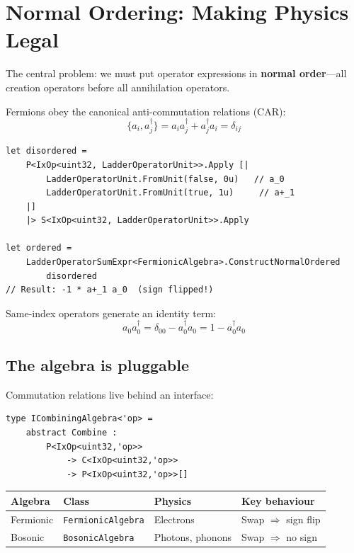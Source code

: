 \documentclass[10pt,a4paper]{article}
\begin{document}
\section{Normal Ordering: Making Physics Legal}\label{ch:normal}

The central problem: we must put operator expressions in \textbf{normal
order}---all creation operators before all annihilation operators.

Fermions obey the canonical anti-commutation relations (CAR):
%
\begin{equation}
\{a_i, a^\dagger_j\} = a_i a^\dagger_j + a^\dagger_j a_i = \delta_{ij}
\end{equation}

\begin{lstlisting}
let disordered =
    P<IxOp<uint32, LadderOperatorUnit>>.Apply [|
        LadderOperatorUnit.FromUnit(false, 0u)   // a_0
        LadderOperatorUnit.FromUnit(true, 1u)     // a+_1
    |]
    |> S<IxOp<uint32, LadderOperatorUnit>>.Apply

let ordered =
    LadderOperatorSumExpr<FermionicAlgebra>.ConstructNormalOrdered
        disordered
// Result: -1 * a+_1 a_0  (sign flipped!)
\end{lstlisting}

Same-index operators generate an identity term:
%
\begin{equation}
a_0 a^\dagger_0 = \delta_{00} - a^\dagger_0 a_0 = 1 - a^\dagger_0 a_0
\end{equation}

\subsection{The algebra is pluggable}

Commutation relations live behind an interface:

\begin{lstlisting}
type ICombiningAlgebra<'op> =
    abstract Combine :
        P<IxOp<uint32,'op>>
            -> C<IxOp<uint32,'op>>
            -> P<IxOp<uint32,'op>>[]
\end{lstlisting}

\begin{center}
\begin{tabular}{llll}
\toprule
\textbf{Algebra} & \textbf{Class} & \textbf{Physics} & \textbf{Key behaviour} \\
\midrule
Fermionic & \texttt{FermionicAlgebra} & Electrons & Swap $\Rightarrow$ sign flip \\
Bosonic   & \texttt{BosonicAlgebra}   & Photons, phonons & Swap $\Rightarrow$ no sign \\
\bottomrule
\end{tabular}
\end{center}
\end{document}
